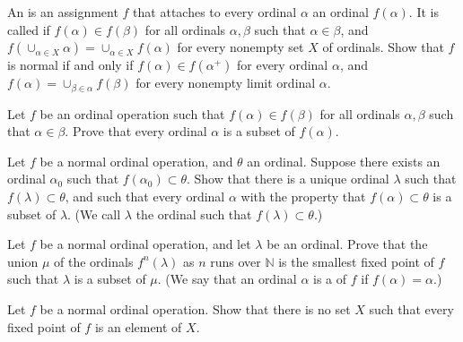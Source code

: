 \documentclass{article}
\begin{document}
\begin{exercise}
  \label{exe:1npoplek}
  An  is an assignment \(f\) that
  attaches to every ordinal \(\alpha\) an ordinal \(f(\alpha)\).  It
  is called  if \(f(\alpha) \in f(\beta)\) for all
  ordinals \(\alpha, \beta\) such that \(\alpha \in \beta\), and
  \(f(\cup_{\alpha \in X} \alpha) = \cup_{\alpha \in X} f(\alpha)\)
  for every nonempty set \(X\) of ordinals.  Show that \(f\) is normal
  if and only if \(f(\alpha) \in f(\alpha^+)\) for every ordinal
  \(\alpha\), and \(f(\alpha) = \cup_{\beta \in \alpha}f(\beta)\) for
  every nonempty limit ordinal \(\alpha\).
\end{exercise}

\begin{exercise}
  \label{exe:fxx1l9m4}
  Let \(f\) be an ordinal operation such that
  \(f(\alpha) \in f(\beta)\) for all ordinals \(\alpha, \beta\) such
  that \(\alpha \in \beta\).  Prove that every ordinal \(\alpha\) is a
  subset of \(f(\alpha)\).
\end{exercise}

\begin{exercise}
  \label{exe:pf75g5kz}
  Let \(f\) be a normal ordinal operation, and \(\theta\) an ordinal.
  Suppose there exists an ordinal \(\alpha_0\) such that
  \(f(\alpha_0) \subset \theta\).  Show that there is a unique ordinal
  \(\lambda\) such that \(f(\lambda) \subset \theta\), and such that
  every ordinal \(\alpha\) with the property that
  \(f(\alpha) \subset \theta\) is a subset of \(\lambda\).  (We call
  \(\lambda\) the  ordinal such that
  \(f(\lambda) \subset \theta\).)
\end{exercise}

\begin{exercise}
  \label{exe:vxxp03js}
  Let \(f\) be a normal ordinal operation, and let \(\lambda\) be an
  ordinal.  Prove that the union \(\mu\) of the ordinals
  \(f^n(\lambda)\) as \(n\) runs over \(\mathbb{N}\) is the smallest
  fixed point of \(f\) such that \(\lambda\) is a subset of \(\mu\).
  (We say that an ordinal \(\alpha\) is a  of
  \(f\) if \(f(\alpha) = \alpha\).)
\end{exercise}

\begin{exercise}
  \label{exe:vag0ubn5}
  Let \(f\) be a normal ordinal operation.  Show that there is no set
  \(X\) such that every fixed point of \(f\) is an element of \(X\).
\end{exercise}
\end{document}
